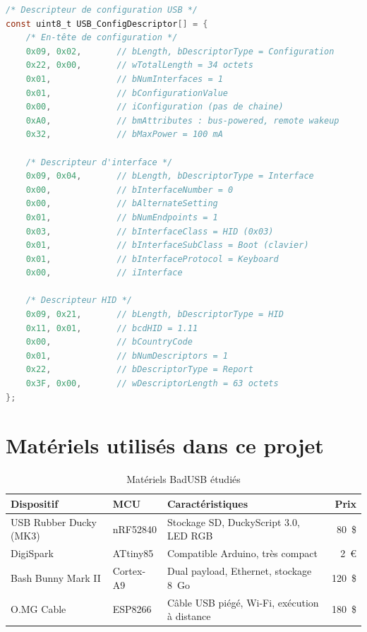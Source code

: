 \documentclass[12pt,a4paper]{report}
\begin{document}
\begin{lstlisting}[language=C, caption={Descripteur d'interface HID -- clavier USB (extrait C simplifié)}, label=lst:descriptor]
/* Descripteur de configuration USB */
const uint8_t USB_ConfigDescriptor[] = {
    /* En-tête de configuration */
    0x09, 0x02,       // bLength, bDescriptorType = Configuration
    0x22, 0x00,       // wTotalLength = 34 octets
    0x01,             // bNumInterfaces = 1
    0x01,             // bConfigurationValue
    0x00,             // iConfiguration (pas de chaine)
    0xA0,             // bmAttributes : bus-powered, remote wakeup
    0x32,             // bMaxPower = 100 mA

    /* Descripteur d'interface */
    0x09, 0x04,       // bLength, bDescriptorType = Interface
    0x00,             // bInterfaceNumber = 0
    0x00,             // bAlternateSetting
    0x01,             // bNumEndpoints = 1
    0x03,             // bInterfaceClass = HID (0x03)
    0x01,             // bInterfaceSubClass = Boot (clavier)
    0x01,             // bInterfaceProtocol = Keyboard
    0x00,             // iInterface

    /* Descripteur HID */
    0x09, 0x21,       // bLength, bDescriptorType = HID
    0x11, 0x01,       // bcdHID = 1.11
    0x00,             // bCountryCode
    0x01,             // bNumDescriptors = 1
    0x22,             // bDescriptorType = Report
    0x3F, 0x00,       // wDescriptorLength = 63 octets
};
\end{lstlisting}

\section{Matériels utilisés dans ce projet}

\begin{table}[H]
  \centering
  \caption{Matériels BadUSB étudiés}
  \label{tab:materiel}
  \begin{tabularx}{\linewidth}{l l X r}
    \toprule
    \textbf{Dispositif}     & \textbf{MCU}         & \textbf{Caractéristiques}                   & \textbf{Prix} \\
    \midrule
    USB Rubber Ducky (MK3)  & nRF52840             & Stockage SD, DuckyScript 3.0, LED RGB        & 80~\$ \\
    DigiSpark               & ATtiny85             & Compatible Arduino, très compact              & 2~€  \\
    Bash Bunny Mark II      & Cortex-A9            & Dual payload, Ethernet, stockage 8~Go        & 120~\$ \\
    O.MG Cable              & ESP8266              & Câble USB piégé, Wi-Fi, exécution à distance & 180~\$ \\
    \bottomrule
  \end{tabularx}
\end{table}
\end{document}
